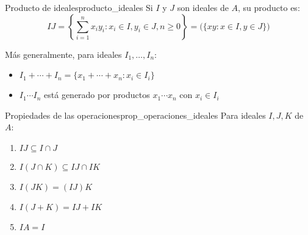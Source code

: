 \begin{definition}{Producto de ideales}{producto_ideales}
    Si \(I\) y \(J\) son ideales de \(A\), su {producto} es:
    \[
    IJ = \left\{\sum_{i=1}^n x_i y_i : x_i \in I, y_i \in J, n \geq 0\right\} = \Big(\{xy : x \in I, y \in J\}\Big)
    \]
\end{definition}

\begin{remark}
    Más generalmente, para ideales \(I_1, \ldots, I_n\):
    \begin{itemize}
        \item \(I_1 + \cdots + I_n = \{x_1 + \cdots + x_n : x_i \in I_i\}\)
        \item \(I_1 \cdots I_n\) está generado por productos \(x_1 \cdots x_n\) con \(x_i \in I_i\)
    \end{itemize}
\end{remark}

\begin{proposition}{Propiedades de las operaciones}{prop_operaciones_ideales}
    Para ideales \(I, J, K\) de \(A\):
    \begin{enumerate}
        \item \(IJ \subseteq I \cap J\)
        \item \(I(J \cap K) \subseteq IJ \cap IK\)
        \item \(I(JK) = (IJ)K\)
        \item \(I(J + K) = IJ + IK\)
        \item \(IA = I\)
    \end{enumerate}
\end{proposition}

